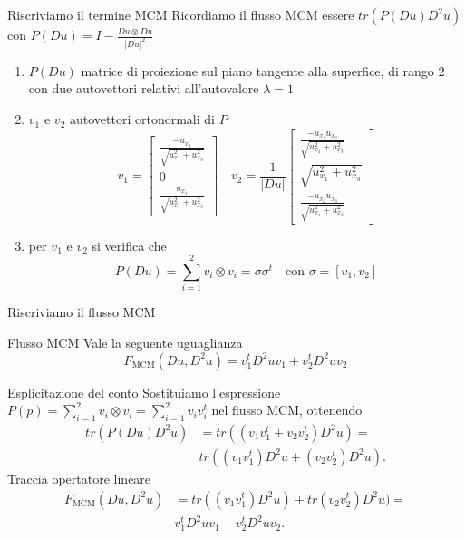 \begin{frame}{Riscriviamo il termine MCM}
  Ricordiamo il flusso MCM essere $tr(P(Du)D^2u)$ con
  $P(Du)=I-\frac{Du\otimes Du}{|Du|^2}$
  \begin{enumerate}
    \item $P(Du)$ matrice di proiezione sul piano tangente alla
      superfice, di rango $2$ con due autovettori relativi
      all'autovalore $\lambda=1$ 
    \item  $v_1$ e $v_2$ autovettori ortonormali di $P$ 
      \[
      v_1=
      \begin{bmatrix}
        \frac{-u_{x_3}}{\sqrt{u_{x_1}^2+u_{x_3}^2}} \\
        0 \\
        \frac{u_{x_1}}{\sqrt{u_{x_1}^2+u_{x_3}^2}}
      \end{bmatrix}
      \quad
      v_2=\frac{1}{|Du|}
      \begin{bmatrix}
        \frac{-u_{x_1}u_{x_2}}{\sqrt{u_{x_1}^2+u_{x_3}^2}} \\
        \sqrt{u_{x_1}^2+u_{x_3}^2} \\
        \frac{-u_{x_2}u_{x_3}}{\sqrt{u_{x_1}^2+u_{x_3}^2}}
      \end{bmatrix}
      \]
    \item per $v_1$ e $v_2$ si verifica che 
    \[
    P(Du)=\sum_{i=1}^2v_i\otimes v_i=\sigma\sigma^t\quad\text{con }
    \sigma=[v_1,v_2] 
    \]
  \end{enumerate}
\end{frame}

\begin{frame}{Riscriviamo il flusso MCM}
  \begin{alertblock}{Flusso MCM}
    Vale la seguente uguaglianza
    \[
    F_{\text{MCM}}(Du,D^2u)=v_1^tD^2uv_1+v_2^tD^2uv_2
    \]
  \end{alertblock}
  \begin{block}{Esplicitazione del conto}
  Sostituiamo l'espressione  $P(p)=\sum_{i=1}^2v_i\otimes
  v_i=\sum_{i=1}^2v_iv_i^t$ nel flusso MCM, ottenendo
  \[
  \begin{aligned}
    tr(P(Du)D^2u)&=tr((v_1v_1^t+v_2v_2^t)D^2u)=\\
    &tr((v_1v_1^t)D^2u+(v_2v_2^t)D^2u).
  \end{aligned}
  \]
  Traccia opertatore lineare
  \[
  \begin{aligned}
    F_{\text{MCM}}(Du,D^2u)&=tr((v_1v_1^t)D^2u)+tr(v_2v_2^t)D^2u)=\\
    &v_1^tD^2uv_1+v_2^tD^2uv_2.
  \end{aligned}
    \]
  \end{block}
\end{frame}

